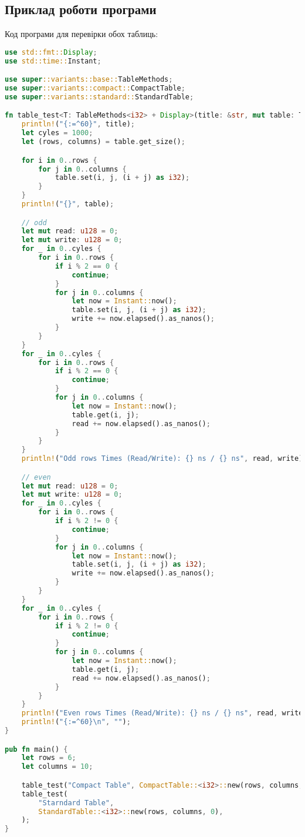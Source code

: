\subsection{Приклад роботи програми}
\noindent
Код програми для перевірки обох таблиць:
\begin{lstlisting}[language=Rust, style=colouredRust]
use std::fmt::Display;
use std::time::Instant;

use super::variants::base::TableMethods;
use super::variants::compact::CompactTable;
use super::variants::standard::StandardTable;

fn table_test<T: TableMethods<i32> + Display>(title: &str, mut table: T) {
    println!("{:=^60}", title);
    let cyles = 1000;
    let (rows, columns) = table.get_size();

    for i in 0..rows {
        for j in 0..columns {
            table.set(i, j, (i + j) as i32);
        }
    }
    println!("{}", table);

    // odd
    let mut read: u128 = 0;
    let mut write: u128 = 0;
    for _ in 0..cyles {
        for i in 0..rows {
            if i % 2 == 0 {
                continue;
            }
            for j in 0..columns {
                let now = Instant::now();
                table.set(i, j, (i + j) as i32);
                write += now.elapsed().as_nanos();
            }
        }
    }
    for _ in 0..cyles {
        for i in 0..rows {
            if i % 2 == 0 {
                continue;
            }
            for j in 0..columns {
                let now = Instant::now();
                table.get(i, j);
                read += now.elapsed().as_nanos();
            }
        }
    }
    println!("Odd rows Times (Read/Write): {} ns / {} ns", read, write);

    // even
    let mut read: u128 = 0;
    let mut write: u128 = 0;
    for _ in 0..cyles {
        for i in 0..rows {
            if i % 2 != 0 {
                continue;
            }
            for j in 0..columns {
                let now = Instant::now();
                table.set(i, j, (i + j) as i32);
                write += now.elapsed().as_nanos();
            }
        }
    }
    for _ in 0..cyles {
        for i in 0..rows {
            if i % 2 != 0 {
                continue;
            }
            for j in 0..columns {
                let now = Instant::now();
                table.get(i, j);
                read += now.elapsed().as_nanos();
            }
        }
    }
    println!("Even rows Times (Read/Write): {} ns / {} ns", read, write);
    println!("{:=^60}\n", "");
}

pub fn main() {
    let rows = 6;
    let columns = 10;

    table_test("Compact Table", CompactTable::<i32>::new(rows, columns, 0));
    table_test(
        "Starndard Table",
        StandardTable::<i32>::new(rows, columns, 0),
    );
}
\end{lstlisting}


